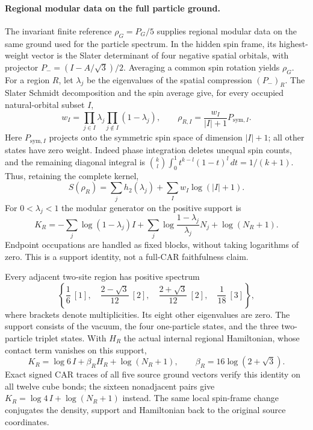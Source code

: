 \paragraph{Regional modular data on the full particle ground.}

The invariant finite reference $\rho_G=P_G/5$ supplies regional
modular data on the same ground used for the particle spectrum.
In the hidden spin frame, its highest-weight vector is the Slater
determinant of four negative spatial orbitals, with projector
$P_-=(I-A/\sqrt3)/2$. Averaging a common spin rotation yields $\rho_G$.
For a region $R$, let $\lambda_j$ be the eigenvalues of the spatial
compression $(P_-)_R$. The Slater Schmidt decomposition and the spin
average give, for every occupied natural-orbital subset $I$,
\begin{equation}
 w_I=\prod_{j\in I}\lambda_j\prod_{j\notin I}(1-\lambda_j),
 \qquad
 \rho_{R,I}=\frac{w_I}{|I|+1}P_{\mathrm{sym},I}.
\end{equation}
Here $P_{\mathrm{sym},I}$ projects onto the symmetric spin space of
dimension $|I|+1$; all other states have zero weight. Indeed phase
integration deletes unequal spin counts, and the remaining diagonal
integral is
$\binom{k}{l}\int_0^1t^{k-l}(1-t)^l\,dt=1/(k+1)$.
Thus, retaining the complete kernel,
\begin{equation}
 S(\rho_R)=\sum_j h_2(\lambda_j)+\sum_I w_I\log(|I|+1).
\end{equation}
For $0<\lambda_j<1$ the modular generator on the positive support is
\begin{equation}
 K_R=-\sum_j\log(1-\lambda_j)I
 +\sum_j\log\frac{1-\lambda_j}{\lambda_j}N_j+\log(N_R+1).
\end{equation}
Endpoint occupations are handled as fixed blocks, without taking
logarithms of zero. This is a support identity, not a full-CAR
faithfulness claim.

Every adjacent two-site region has positive spectrum
\begin{equation}
 \left\{\frac16\ [1],\quad
 \frac{2-\sqrt3}{12}\ [2],\quad
 \frac{2+\sqrt3}{12}\ [2],\quad
 \frac1{18}\ [3]\right\},
\end{equation}
where brackets denote multiplicities. Its eight other eigenvalues are
zero. The support consists of the vacuum, the four one-particle states,
and the three two-particle triplet states. With $H_R$ the actual internal
regional Hamiltonian, whose contact term vanishes on this support,
\begin{equation}
 K_R=\log6\,I+\beta_R H_R+\log(N_R+1),
 \qquad \beta_R=16\log(2+\sqrt3).
\end{equation}
Exact signed CAR traces of all five source ground vectors verify this
identity on all twelve cube bonds; the sixteen nonadjacent pairs give
$K_R=\log4\,I+\log(N_R+1)$ instead. The same local spin-frame change
conjugates the density, support and Hamiltonian back to the original
source coordinates.

